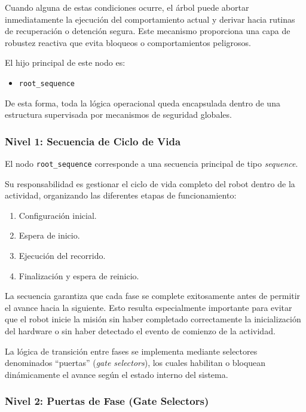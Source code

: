 \documentclass{prgrado}
\begin{document}
Cuando alguna de estas condiciones ocurre, el árbol puede abortar inmediatamente la ejecución del comportamiento actual y derivar hacia rutinas de recuperación o detención segura. Este mecanismo proporciona una capa de robustez reactiva que evita bloqueos o comportamientos peligrosos.

El hijo principal de este nodo es:

\begin{itemize}
    \item \texttt{root\_sequence}
\end{itemize}

De esta forma, toda la lógica operacional queda encapsulada dentro de una estructura supervisada por mecanismos de seguridad globales.

\subsubsection{Nivel 1: Secuencia de Ciclo de Vida}

El nodo \texttt{root\_sequence} corresponde a una secuencia principal de tipo \textit{sequence}.

Su responsabilidad es gestionar el ciclo de vida completo del robot dentro de la actividad, organizando las diferentes etapas de funcionamiento:

\begin{enumerate}
    \item Configuración inicial.
    \item Espera de inicio.
    \item Ejecución del recorrido.
    \item Finalización y espera de reinicio.
\end{enumerate}

La secuencia garantiza que cada fase se complete exitosamente antes de permitir el avance hacia la siguiente. Esto resulta especialmente importante para evitar que el robot inicie la misión sin haber completado correctamente la inicialización del hardware o sin haber detectado el evento de comienzo de la actividad.

La lógica de transición entre fases se implementa mediante selectores denominados ``puertas'' (\textit{gate selectors}), los cuales habilitan o bloquean dinámicamente el avance según el estado interno del sistema.

\subsubsection{Nivel 2: Puertas de Fase (Gate Selectors)}
\end{document}
